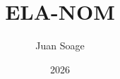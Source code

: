 ﻿\documentclass[aspectratio=169,12pt,compress]{beamer}
\title[ELA-NOM]{ELA-NOM}
\author[Juan Soage]{Juan Soage}
\date{2026}
\begin{document}
\conclusiones
\end{document}
